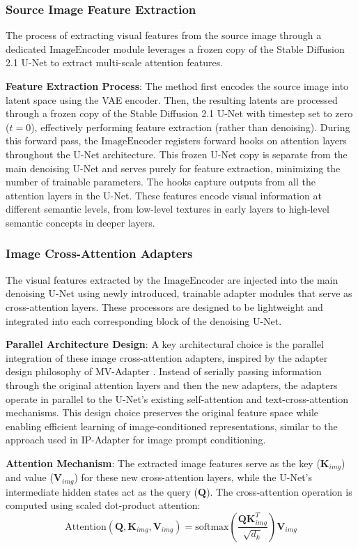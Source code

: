 \subsubsection{Source Image Feature Extraction}
The process of extracting visual features from the source image through a dedicated $\text{ImageEncoder}$ module leverages a frozen copy of the Stable Diffusion 2.1 U-Net to extract multi-scale attention features.

\textbf{Feature Extraction Process}: The method first encodes the source image into latent space using the VAE encoder. Then, the resulting latents are processed through a frozen copy of the Stable Diffusion 2.1 U-Net with timestep set to zero ($t=0$), effectively performing feature extraction (rather than denoising). During this forward pass, the $\text{ImageEncoder}$ registers forward hooks on attention layers throughout the U-Net architecture. This frozen U-Net copy is separate from the main denoising U-Net and serves purely for feature extraction, minimizing the number of trainable parameters. The hooks capture outputs from all the attention layers in the U-Net. These features encode visual information at different semantic levels, from low-level textures in early layers to high-level semantic concepts in deeper layers.

\subsubsection{Image Cross-Attention Adapters}
The visual features extracted by the $\text{ImageEncoder}$ are injected into the main denoising U-Net using newly introduced, trainable adapter modules that serve as cross-attention layers. These processors are designed to be lightweight and integrated into each corresponding block of the denoising U-Net.

\textbf{Parallel Architecture Design}: A key architectural choice is the parallel integration of these image cross-attention adapters, inspired by the adapter design philosophy of MV-Adapter \cite{mvadapter}. Instead of serially passing information through the original attention layers and then the new adapters, the adapters operate in parallel to the U-Net's existing self-attention and text-cross-attention mechanisms. This design choice preserves the original feature space while enabling efficient learning of image-conditioned representations, similar to the approach used in IP-Adapter \cite{ipadapter} for image prompt conditioning.

\textbf{Attention Mechanism}: The extracted image features serve as the key ($\mathbf{K}_{img}$) and value ($\mathbf{V}_{img}$) for these new cross-attention layers, while the U-Net's intermediate hidden states act as the query ($\mathbf{Q}$). The cross-attention operation is computed using scaled dot-product attention:
\[ \text{Attention}(\mathbf{Q}, \mathbf{K}_{img}, \mathbf{V}_{img}) = \text{softmax}\left(\frac{\mathbf{Q}\mathbf{K}_{img}^T}{\sqrt{d_k}}\right)\mathbf{V}_{img} \]


